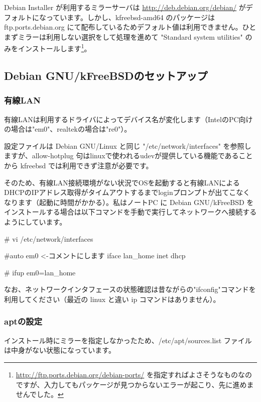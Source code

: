 \documentclass[mingoth,a4paper]{jsarticle}
\begin{document}
Debian Installer が利用するミラーサーバは \url{http://deb.debian.org/debian/} がデフォルトになっています。しかし、kfreebsd-amd64 のパッケージは ftp.ports.debian.org にて配布しているためデフォルト値は利用できません。ひとまずミラーは利用しない選択をして処理を進めて "Standard system utilities" のみをインストールします\footnote{\url{http://ftp.ports.debian.org/debian-ports/} を指定すればよさそうなものなのですが、入力してもパッケージが見つからないエラーが起こり、先に進めませんでした。}。


\subsection{Debian GNU/kFreeBSDのセットアップ}

\subsubsection{有線LAN}

有線LANは利用するドライバによってデバイス名が変化します（IntelのPC向けの場合は"em0"、realtekの場合は"re0"）。

設定ファイルは Debian GNU/Linux と同じ "/etc/network/interfaces" を参照しますが、allow-hotplug 句はlinuxで使われるudevが提供している機能であることから kfreebsd では利用できず注意が必要です。

そのため、有線LAN接続環境がない状況でOSを起動すると有線LANによるDHCPのIPアドレス取得がタイムアウトするまでloginプロンプトが出てこなくなります（起動に時間がかかる）。私はノートPC に Debian GNU/kFreeBSD をインストールする場合は以下コマンドを手動で実行してネットワークへ接続するようにしています。

\begin{commandline}
# vi /etc/network/interfaces

#auto em0  <-コメントにします
iface lan_home inet dhcp
\end{commandline}

\begin{commandline}
# ifup em0=lan_home
\end{commandline}

なお、ネットワークインタフェースの状態確認は昔ながらの"ifconfig"コマンドを利用してください（最近の linux と違い ip コマンドはありません）。

\subsubsection{aptの設定}

インストール時にミラーを指定しなかったため、/etc/apt/sources.list ファイルは中身がない状態になっています。
\end{document}
